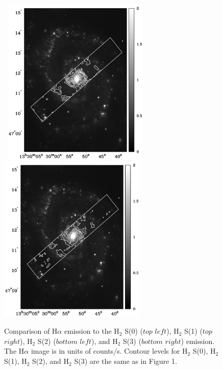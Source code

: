 \documentclass[manuscript]{aastex}
\begin{document}
\begin{figure}[!h]
\centerline{\hbox{\hspace{0.0in}
\includegraphics[width=7cm,angle=0]{bw_h2s2_ha.jpg}
\hspace{0.1in}
\includegraphics[width=7cm,angle=0]{bw_h2s3_ha.jpg}}}
\caption{Comparison of H$\alpha$ emission to the $\mathrm{H_2}$ S(0) ($top$ $left$),  $\mathrm{H_2}$ S(1) ($top$ $right$),  $\mathrm{H_2}$ S(2) ($bottom$ $left$),  and $\mathrm{H_2}$ S(3) ($bottom$ $right$) emission.  The H$\alpha$ image is in units of counts/s.  Contour levels for $\mathrm{H_2}$ S(0), $\mathrm{H_2}$ S(1), $\mathrm{H_2}$ S(2), and $\mathrm{H_2}$ S(3) are the same as in Figure 1.\label{fig10}}
\end{figure}

\clearpage
\end{document}
